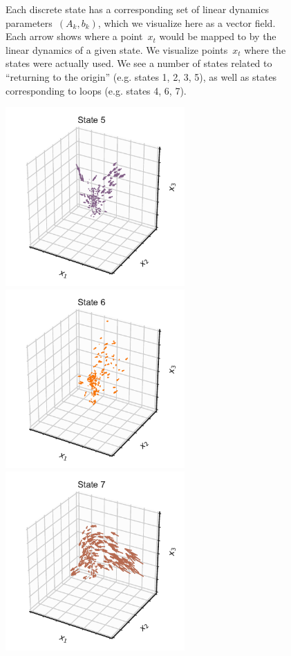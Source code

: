 \documentclass{article}
\begin{document}
\begin{figure}[h]
\caption{Each discrete state has a corresponding set of linear dynamics
  parameters~$(A_k, b_k)$, which we visualize here as a vector field.
  Each arrow shows where a point~$x_t$ would be mapped to by the 
  linear dynamics of a given state. We visualize points~$x_t$ where
  the states were actually used. We see a number of states related
  to ``returning to the origin'' (e.g. states 1, 2, 3, 5), as well
  as states corresponding to loops (e.g. states 4, 6, 7).}
\label{fig:dynamics}
\end{figure}

\begin{figure}[h]
  \centering%
  \includegraphics[width=2.7in]{figures/arhmm/dynamics_123_4.pdf}
  \includegraphics[width=2.7in]{figures/arhmm/dynamics_123_5.pdf}
  \\
  \includegraphics[width=2.7in]{figures/arhmm/dynamics_123_6.pdf}

\end{figure}
\end{document}
